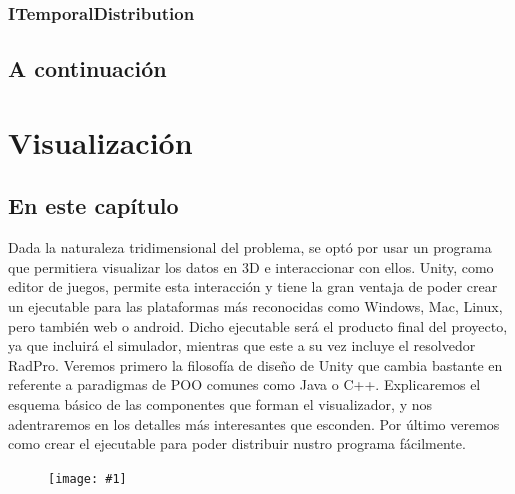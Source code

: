 \documentclass[12pt,a4paper,openright,oneside]{article}
\newcommand{\includeImage}[1]
{
	\begin{figure}[htb]
	\begin{center}
	\texttt{[image: \#1]}
	\end{center}
	\end{figure}
}
\numberwithin{equation}{section}
\theoremstyle{definition}
\begin{document}
\subsubsection{ITemporalDistribution}

\subsection{A continuación}
\newpage




\section{Visualización}

\subsection{En este capítulo}
Dada la naturaleza tridimensional del problema, se optó por usar un programa que permitiera visualizar los datos en 3D e interaccionar con ellos. Unity, como editor de juegos, permite esta interacción y tiene la gran ventaja de poder crear un ejecutable para las plataformas más reconocidas como Windows, Mac, Linux, pero también web o android. Dicho ejecutable será el producto final del proyecto, ya que incluirá el simulador, mientras que este a su vez incluye el resolvedor RadPro. Veremos primero la filosofía de diseño de Unity que cambia bastante en referente a paradigmas de POO comunes como Java o C++. Explicaremos el esquema básico de las componentes que forman el visualizador, y nos adentraremos en los detalles más interesantes que esconden. Por último veremos como crear el ejecutable para poder distribuir nustro programa fácilmente.
\includeImage{visualization.png}
\end{document}
